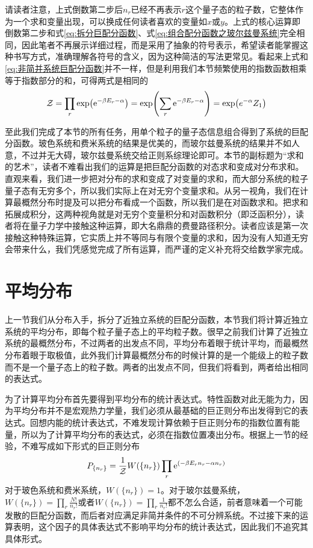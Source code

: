 \documentclass[../../main.tex]{subfiles}
\begin{document}
请读者注意，上式倒数第二步后\(n_r\)已经不再表示\(r\)这个量子态的粒子数，它整体作为一个求和变量出现，可以换成任何读者喜欢的变量如\(x\)或\(y\)。上式的核心运算即倒数第二步和式\eqref{eq:拆分巨配分函数}、式\eqref{eq:组合配分函数之玻尔兹曼系统}完全相同，因此笔者不再展示详细过程，而是采用了抽象的符号表示，希望读者能掌握这种书写方式，准确理解各符号的含义，因为这种简洁的写法更常见。看起来上式和\eqref{eq:非简并系统巨配分函数}并不一样，但是利用我们本节频繁使用的指数函数相乘等于指数部分的和，可得两式是相同的
\begin{equation}
    \mathcal{Z}=\prod_r \exp(\mathrm{e}^{-\beta E_r-\alpha})=\exp(\sum_r \mathrm{e}^{-\beta E_r-\alpha})=\exp(e^{-\alpha}Z_1)
\end{equation}

至此我们完成了本节的所有任务，用单个粒子的量子态信息组合得到了系统的巨配分函数。玻色系统和费米系统的结果是优美的，而玻尔兹曼系统的结果并不如人意，不过并无大碍，玻尔兹曼系统交给正则系综理论即可。本节的副标题为“求和的艺术”，读者不难看出我们的运算是把巨配分函数的对态求和变成对分布求和。直观来看，我们进一步把对分布的求和变成了对变量的求和，而大部分系统的粒子量子态有无穷多个，所以我们实际上在对无穷个变量求和。从另一视角，我们在计算最概然分布时提及可以把分布看成一个函数，所以我们是在对函数求和。把求和拓展成积分，这两种视角就是对无穷个变量积分和对函数积分（即泛函积分），读者将在量子力学中接触这种运算，即大名鼎鼎的费曼路径积分。读者应该是第一次接触这种特殊运算，它实质上并不等同与有限个变量的求和，因为没有人知道无穷会带来什么，我们凭感觉完成了所有运算，而严谨的定义补充将交给数学家完成。

\section{平均分布}
上一节我们从分布入手，拆分了近独立系统的巨配分函数，本节我们将计算近独立系统的平均分布，即每个粒子量子态上的平均粒子数。很早之前我们计算了近独立系统的最概然分布，不过两者的出发点不同，平均分布着眼于统计平均，而最概然分布着眼于取极值，此外我们计算最概然分布的时候计算的是一个能级上的粒子数而不是一个量子态上的粒子数。两者的出发点不同，但我们将看到，两者给出相同的表达式。

为了计算平均分布首先要得到平均分布的统计表达式。特性函数对此无能为力，因为平均分布并不是宏观热力学量，我们必须从最基础的巨正则分布出发得到它的表达式。回想内能的统计表达式，不难发现计算依赖于巨正则分布的指数位置有能量，所以为了计算平均分布的表达式，必须在指数位置凑出分布。根据上一节的经验，不难写成如下形式的巨正则分布
\begin{equation}\label{eq:巨正则系综分布概率}
    P_{\{n_r\}}=\frac{1}{\mathcal{Z}}W(\{n_r\})\prod_r \mathrm{e}^{(-\beta E_rn_r-\alpha n_r)}
\end{equation}
对于玻色系统和费米系统，\(W(\{n_r\})=1\)。对于玻尔兹曼系统，\(W(\{n_r\})=\prod_r \frac{N!}{n_r!}\)或者\(W(\{n_r\})=\prod_r \frac{1}{n_r!}\)都不怎么合适，前者意味着一个可能发散的巨配分函数，而后者对应满足非简并条件的不可分辨系统。不过接下来的运算表明，这个因子的具体表达式不影响平均分布的统计表达式，因此我们不追究其具体形式。
\end{document}
